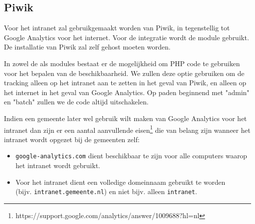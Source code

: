 \subsection{Piwik}\label{analyticsintranet}

Voor het intranet zal gebruikgemaakt worden van Piwik, in tegenstellig tot Google Analytics voor het internet. Voor de integratie wordt de  module gebruikt. De installatie van Piwik zal zelf gehost moeten worden.

In zowel de  als  modules bestaat er de mogelijkheid om PHP code te gebruiken voor het bepalen van de beschikbaarheid. We zullen deze optie gebruiken om de tracking alleen op het intranet aan te zetten in het geval van Piwik, en alleen op het internet in het geval van Google Analytics. Op paden beginnend met "admin" en "batch" zullen we de code altijd uitschakelen.

Indien een gemeente later wel gebruik wilt maken van Google Analytics voor het intranet dan zijn er een aantal aanvullende eisen\footnote{https://support.google.com/analytics/answer/1009688?hl=nl} die van belang zijn wanneer het intranet wordt opgezet bij de gemeenten zelf:
\begin{itemize}
\item \texttt{google-analytics.com} dient beschikbaar te zijn voor alle computers waarop het intranet wordt gebruikt.
\item Voor het intranet dient een volledige domeinnaam gebruikt te worden \\ (bijv. \texttt{intranet.gemeente.nl}) en niet bijv. alleen \texttt{intranet}.
\end{itemize}

